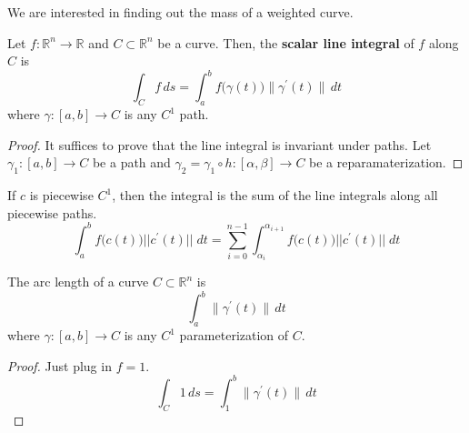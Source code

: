 	We are interested in finding out the mass of a weighted curve. 
		
  \begin{definition}
		Let $f: \mathbb{R}^n \to \mathbb{R}$ and $C \subset \mathbb{R}^n$ be a curve. Then, the \textbf{scalar line integral} of $f$ along $C$ is 
		\begin{equation}
			\int_C f \,ds  = \int_a^b f\big(\gamma(t)\big) \|\gamma^\prime (t)\| \,dt
		\end{equation}
		where $\gamma: [a, b] \to C$ is any $C^1$ path. 
  \end{definition}
	\begin{proof}
		It suffices to prove that the line integral is invariant under paths. Let $\gamma_1: [a, b] \to C$ be a path and $\gamma_2 = \gamma_1 \circ h: [\alpha, \beta] \to C$ be a reparamaterization. 
	\end{proof}
		
	If $c$ is piecewise $C^1$, then the integral is the sum of the line integrals along all piecewise paths. 
	\begin{equation}
		\int_a^b f\big(c(t)\big) ||c^\prime (t)|| \;d t = \sum_{i = 0}^{n-1} \int_{\alpha_i}^{\alpha_{i+1}} f\big(c(t)\big) ||c^\prime (t)|| \; d t
	\end{equation}
		
	\begin{lemma}
		The arc length of a curve $C \subset \mathbb{R}^n$ is 
		\begin{equation}
			\int_a^b \|\gamma^\prime (t)\| \,dt 
		\end{equation}
		where $\gamma: [a, b] \to C$ is any $C^1$ parameterization of $C$. 
	\end{lemma}
	\begin{proof}
	  Just plug in $f = 1$. 
		\begin{equation}
			\int_C 1 \,ds  = \int_1^b \|\gamma^\prime (t)\| \,dt
		\end{equation}
	\end{proof}
		
	\begin{lemma}
	
	\end{lemma}
		
